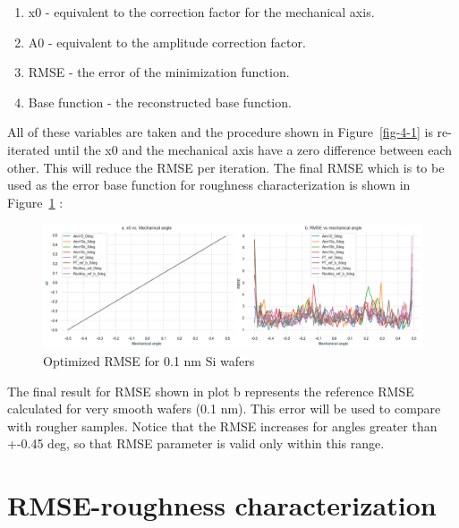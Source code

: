 \documentclass[
  letterpaper,
  DIV=11,
  numbers=noendperiod,
  oneside]{scrreprt}
\providecommand{\tightlist}{%
  \setlength{\itemsep}{0pt}\setlength{\parskip}{0pt}}\usepackage{longtable,booktabs,array}
\begin{document}
\begin{enumerate}
\def\labelenumi{\arabic{enumi}.}
\tightlist
\item
  x0 - equivalent to the correction factor for the mechanical axis.
\item
  A0 - equivalent to the amplitude correction factor.
\item
  RMSE - the error of the minimization function.
\item
  Base function - the reconstructed base function.
\end{enumerate}

All of these variables are taken and the procedure shown in
Figure~\ref{fig-4-1} is re-iterated until the x0 and the mechanical axis
have a zero difference between each other. This will reduce the RMSE per
iteration. The final RMSE which is to be used as the error base function
for roughness characterization is shown in Figure~\ref{fig-4-6} :

\begin{figure}

{\centering \includegraphics{notebooks/c_optimization_files/figure-pdf/fig-4-6-output-1.png}

}

\caption{\label{fig-4-6}Optimized RMSE for 0.1 nm Si wafers}

\end{figure}

The final result for RMSE shown in plot b represents the reference RMSE
calculated for very smooth wafers (0.1 nm). This error will be used to
compare with rougher samples. Notice that the RMSE increases for angles
greater than +-0.45 deg, so that RMSE parameter is valid only within
this range.

\newpage


\hypertarget{rmse-roughness-characterization}{%
\chapter{RMSE-roughness
characterization}\label{rmse-roughness-characterization}}
\end{document}
